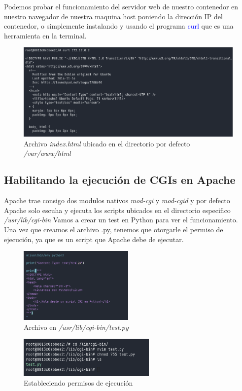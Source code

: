 Podemos probar el funcionamiento del servidor web de nuestro contenedor en nuestro navegador de nuestra 
maquina host poniendo la dirección IP del contenedor, o simplemente instalando y usando el programa 
\textcolor{blue}{curl} que es una herramienta en la terminal.

\begin{figure}[H]
  \centering
  \includegraphics[width=1.0\textwidth]{img/server.png}
  \caption{Archivo \textit{index.html} ubicado en el directorio por defecto \textit{/var/www/html}}
\end{figure}

\subsection{Habilitando la ejecución de CGIs en Apache}
Apache trae consigo dos modulos nativos \textit{mod-cgi} y \textit{mod-cgid} y por defecto Apache solo escuha y ejecuta los scripts ubicados en el directorio especifico \textit{/usr/lib/cgi-bin}
\singlespacing
Vamos a crear un test en Python para ver el funcionamiento. Una vez que creamos el archivo .py, tenemos 
que otorgarle el permiso de ejecución, ya que es un script que Apache debe de ejecutar.

\begin{figure}[H]
  \centering
  \includegraphics[width=0.5\textwidth]{img/create_cgi.png}
  \caption{Archivo en \textit{/usr/lib/cgi-bin/test.py}}
\end{figure}

\begin{figure}[H]
  \centering
  \includegraphics[width=0.6\textwidth]{img/cgi_with_python.png}
  \caption{Estableciendo permisos de ejecución}
\end{figure}

